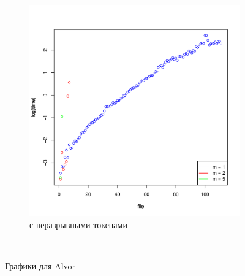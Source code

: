 \documentclass{matmex-diploma}
\begin{document}
\begin{figure}
\begin{subfigure}[b]{0.45\textwidth}
                \includegraphics[width=\textwidth]{Alvor_withoutBreak}
                \caption{с неразрывными токенами}
                \label{fig:Alvor_withoutBreak}
        \end{subfigure}
        ~ %
        \caption{Графики для Alvor}\label{fig:graphs_alvor}
\end{figure}


\end{document}
